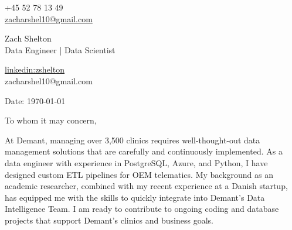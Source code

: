 \documentclass[11pt,a4]{article}
\begin{document}
\begin{center}
    \begin{minipage}[b]{0.24\textwidth}
            \large +45 52 78 13 49 \\
            \large \href{mailto:zacharshel10@gmail.com}{zacharshel10@gmail.com} 
    \end{minipage}%
    \begin{minipage}[b]{0.5\textwidth}
            \centering
            {\Huge Zach Shelton} \\ %
            \vspace{0.1cm}
            {\color{UI_blue} \Large{Data Engineer | Data Scientist}} \\
    \end{minipage}%
    \begin{minipage}[b]{0.24\textwidth}
            \flushright \large
            {\href{https://www.linkedin.com/in/zshelton/}{linkedin:zshelton} } \\
            zacharshel10@gmail.com
    \end{minipage}   
    
\vspace{-0.15cm} 
{\color{UI_blue} \hrulefill}
\end{center}

\justify
\setlength{\parindent}{0pt}
\setlength{\parskip}{12pt}
\vspace{0.1cm}


Date: \today \par \vspace{-0.1cm}

To whom it may concern,

At Demant, managing over 3,500 clinics requires well-thought-out data management solutions that are carefully and continuously implemented. As a data engineer with experience in PostgreSQL, Azure, and Python, I have designed custom ETL pipelines for OEM telematics. My background as an academic researcher, combined with my recent experience at a Danish startup, has equipped me with the skills to quickly integrate into Demant's Data Intelligence Team. I am ready to contribute to ongoing coding and database projects that support Demant's clinics and business goals.
\end{document}
